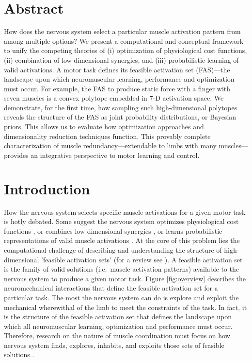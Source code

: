 \documentclass[10pt,letterpaper]{article}
\begin{document}
\section*{Abstract}
How does the nervous system select a particular muscle activation pattern from among multiple options?
We present a computational and conceptual framework to unify the competing theories of (i) optimization of physiological cost functions, (ii) combination of low-dimensional synergies, and (iii) probabilistic learning of valid activations.
A motor task defines its feasible activation set (FAS)---the landscape upon which neuromuscular learning, performance and optimization must occur.
For example, the FAS to produce static force with a finger with seven muscles is a convex polytope embedded in 7-D activation space.
We demonstrate, for the first time, how sampling such high-dimensional polytopes reveals the structure of the FAS as joint probability distributions, or Bayesian priors.
This allows us to evaluate how optimization approaches and dimensionality reduction techniques function.
This provably complete characterization of muscle redundancy---extendable to limbs with many muscles---provides an integrative perspective to motor learning and control.


\section*{Introduction}
How the nervous system selects specific muscle activations for a given motor task is hotly debated. Some suggest the nervous system optimizes physiological cost functions \cite{Chao1978Graphical,Prilutsky2000Muscle,scott2004optimal,todorov2002optimal,crowninshield1981physiologically,higginson2005simulated}, or combines low-dimensional synergies \cite{kutch2012challenges,steele2013number,bizzi2013neural,tresch2009case,dingwell2010walkingvariability,racz2013spatiotemporal,steele2015consequences,alessandro2013musclesynergies}, or learns probabilistic representations of valid muscle activations \cite{kording2004bayesian, Kording2014130, berniker2013examination,sanger2011distributed}.
At the core of this problem lies the computational challenge of describing and understanding the structure of high-dimensional 'feasible activation sets' (for a review see \cite{valero-cuevas2015fundamentals}). A feasible activation set is the family of valid solutions (i.e.\, muscle activation patterns) available to the nervous system to produce a given motor task.  Figure \ref{fig:overview} describes the neuromechanical interactions that define the feasible activation set for a particular task. The most the nervous system can do is explore and exploit the mechanical wherewithal of the limb to meet the constraints of the task. In fact, it is the structure of the feasible activation set that defines the landscape upon which all neuromuscular learning, optimization and performance must occur. Therefore, research on the nature of muscle coordination must  focus on how nervous system finds, explores, inhabits, and exploits those sets of feasible solutions \cite{kutch2012challenges,steele2013number,bizzi2013neural,tresch2009case,dingwell2010walkingvariability,racz2013spatiotemporal,steele2015consequences}.
\end{document}
